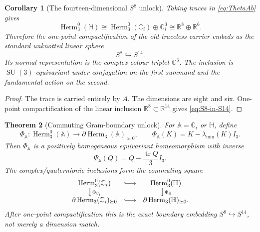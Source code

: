 \documentclass[11pt]{article}
\newtheorem{theorem}{Theorem}[section]
\newtheorem{corollary}[theorem]{Corollary}
\theoremstyle{definition}
\theoremstyle{remark}
\newcommand{\R}{\mathbb R}
\newcommand{\C}{\mathbb C}
\newcommand{\Hh}{\mathbb H}
\newcommand{\Herm}{\operatorname{Herm}}
\newcommand{\tr}{\operatorname{tr}}
\newcommand{\SU}{\operatorname{SU}}
\begin{document}
\begin{corollary}[The fourteen-dimensional $S^8$ unlock]\label{cor:S8-unlock}
Taking traces in \eqref{eq:ThetaAb} gives
\begin{equation}\label{eq:tracefree-split}
 \Herm_3^0(\Hh)
 \cong\Herm_3^0(\C_i)\oplus\C_i^3
 \cong\R^8\oplus\R^6.
\end{equation}
Therefore the one-point compactification of the old traceless carrier embeds as the standard unknotted linear sphere
\begin{equation}\label{eq:S8-in-S14}
 \boxed{S^8\hookrightarrow S^{14}.}
\end{equation}
Its normal representation is the complex colour triplet $\C^3$.  The inclusion is $\SU(3)$-equivariant under conjugation on the first summand and the fundamental action on the second.
\end{corollary}

\begin{proof}
The trace is carried entirely by $A$.  The dimensions are eight and six.  One-point compactification of the linear inclusion $\R^8\subset\R^{14}$ gives \eqref{eq:S8-in-S14}.
\end{proof}



\begin{theorem}[Commuting Gram-boundary unlock]\label{thm:boundary-square}
For $\mathbb A=\C_i$ or $\Hh$, define
\begin{equation}\label{eq:spectral-floor-A}
 \Phi_{\mathbb A}:\Herm_3^0(\mathbb A)
 \longrightarrow\partial\Herm_3(\mathbb A)_{\succeq0},
 \qquad
 \Phi_{\mathbb A}(K)=K-\lambda_{\min}(K)I_3.
\end{equation}
Then $\Phi_{\mathbb A}$ is a positively homogeneous equivariant homeomorphism
with inverse
\begin{equation}\label{eq:spectral-floor-inverse-A}
 \Psi_{\mathbb A}(Q)=Q-\frac{\tr Q}{3}I_3.
\end{equation}
The complex/quaternionic inclusions form the commuting square
\begin{equation}\label{eq:boundary-commuting-square}
\begin{array}{ccc}
 \Herm_3^0(\C_i)&\lhook\joinrel\longrightarrow&\Herm_3^0(\Hh)\\
 \big\downarrow{\scriptstyle\Phi_{\C_i}}&&
 \big\downarrow{\scriptstyle\Phi_{\Hh}}\\
 \partial\Herm_3(\C_i)_{\succeq0}&\lhook\joinrel\longrightarrow&
 \partial\Herm_3(\Hh)_{\succeq0}.
\end{array}
\end{equation}
After one-point compactification this is the exact boundary embedding
$S^8\hookrightarrow S^{14}$, not merely a dimension match.
\end{theorem}
\end{document}
